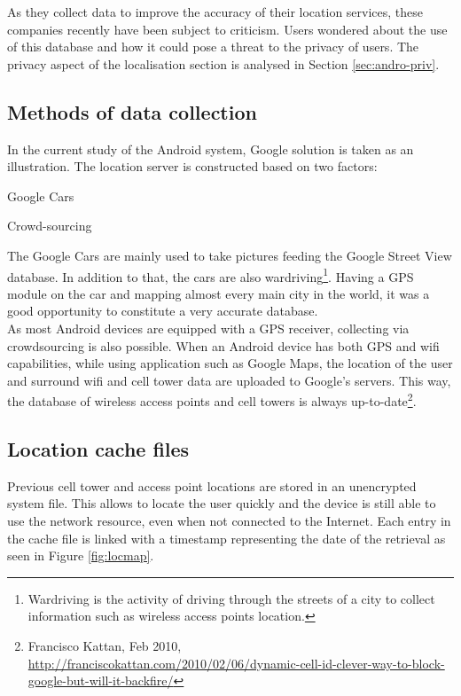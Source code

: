 As they collect data to improve the accuracy of their location services, these companies recently have been subject to criticism.
Users wondered about the use of this database and how it could pose a threat to the privacy of users.
The privacy aspect of the localisation section is analysed in Section \ref{sec:andro-priv}.

\subsection{Methods of data collection}

In the current study of the Android system, Google solution is taken as an illustration.
The location server is constructed based on two factors:
\begin{itemizealt}
\item Google Cars
\item Crowd-sourcing
\end{itemizealt}

The Google Cars are mainly used to take pictures feeding the Google Street View database.
In addition to that, the cars are also wardriving\footnote{Wardriving is the activity of driving through the streets of a city to collect information such as wireless access points location.}.
Having a GPS module on the car and mapping almost every main city in the world, it was a good opportunity to constitute a very accurate database.\\

As most Android devices are equipped with a GPS receiver, collecting via crowdsourcing is also possible.
When an Android device has both GPS and wifi capabilities, while using application such as Google Maps, the location of the user and surround wifi and cell tower data are uploaded to Google's servers.
This way, the database of wireless access points and cell towers is always up-to-date\footnote{Francisco Kattan, Feb 2010, \url{http://franciscokattan.com/2010/02/06/dynamic-cell-id-clever-way-to-block-google-but-will-it-backfire/}}.


\subsection{Location cache files}
\label{sec:loc-cache-files}

Previous cell tower and access point locations are stored in an unencrypted system file.
This allows to locate the user quickly and the device is still able to use the network resource, even when not connected to the Internet.
Each entry in the cache file is linked with a timestamp representing the date of the retrieval as seen in Figure \ref{fig:locmap}.\\

